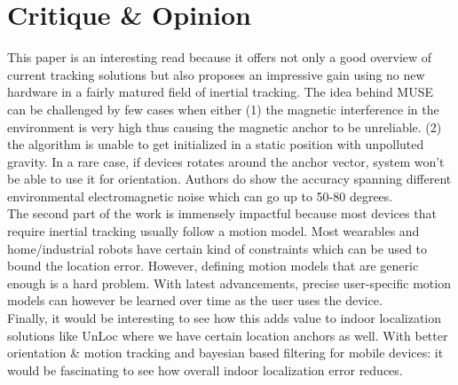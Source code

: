\documentclass[a4paper]{article}
\begin{document}
\section{Critique \& Opinion}
This paper is an interesting read because it offers not only a good overview of current tracking solutions but also proposes an impressive gain using no new hardware in a fairly matured field of inertial tracking. The idea behind MUSE can be challenged by few cases when either (1) the magnetic interference in the environment is very high thus causing the magnetic anchor to be unreliable. (2) the algorithm is unable to get initialized in a static position with unpolluted gravity. In a rare case, if devices rotates around the anchor vector, system won't be able to use it for orientation. Authors do show the accuracy spanning different environmental electromagnetic noise which can go up to 50-80 degrees. \\

The second part of the work is immensely impactful because most devices that require inertial tracking usually follow a motion model. Most wearables and home/industrial robots have certain kind of constraints which can be used to bound the location error. However, defining motion models that are generic enough is a hard problem. With latest advancements, precise user-specific motion models can however be learned over time as the user uses the device. \\

Finally, it would be interesting to see how this adds value to indoor localization solutions like UnLoc where we have certain location anchors as well. With better orientation \& motion tracking and bayesian based filtering for mobile devices: it would be fascinating to see how overall indoor localization error reduces.









 
\end{document}
